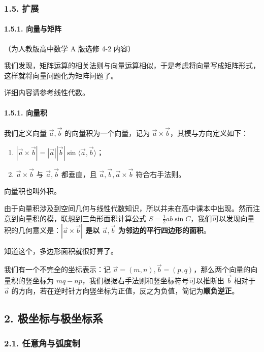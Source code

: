 \subsubsection{1.5. 扩展}

\paragraph{1.5.1. 向量与矩阵}

（为人教版高中数学 A 版选修 4-2 内容）

我们发现，矩阵运算的相关法则与向量运算相似，于是考虑将向量写成矩阵形式，这样就将向量问题化为矩阵问题了。

详细内容请参考线性代数。

\paragraph{1.5.1. 向量积}

我们定义向量 $\vec a,\vec b$ 的向量积为一个向量，记为 $\vec a\times \vec b$，其模与方向定义如下：

\begin{enumerate}
\item $|\vec a\times \vec b|=|\vec a||\vec b|\sin \langle \vec a,\vec b\rangle$；
\item $\vec a\times \vec b$ 与 $\vec a,\vec b$ 都垂直，且 $\vec a,\vec b,\vec a\times \vec b$ 符合右手法则。
\end{enumerate}

向量积也叫外积。

由于向量积涉及到空间几何与线性代数知识，所以并未在高中课本中出现。然而注意到向量积的模，联想到三角形面积计算公式 $S=\frac{1}{2}ab\sin C$，我们可以发现向量积的几何意义是：\textbf{$|\vec a\times \vec b|$ 是以 $\vec a,\vec b$ 为邻边的平行四边形的面积}。

知道这个，多边形面积就很好算了。

我们有一个不完全的坐标表示：记 $\vec a=(m,n),\vec b=(p,q)$，那么两个向量的向量积的竖坐标为 $mq-np$，我们根据右手法则和竖坐标符号可以推断出 $\vec b$ 相对于 $\vec a$ 的方向，若在逆时针方向竖坐标为正值，反之为负值，简记为\textbf{顺负逆正}。

\subsection{2. 极坐标与极坐标系}

\subsubsection{2.1. 任意角与弧度制}

